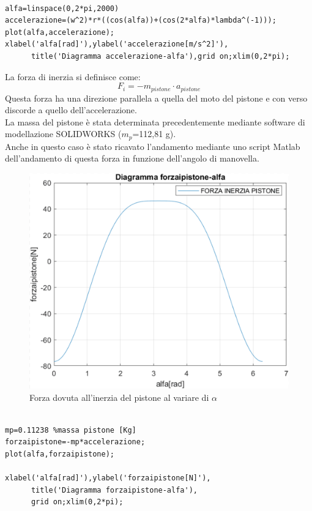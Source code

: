 \begin{lstlisting}[frame=trBL]
%Grafico accelerazione al variare di alfa

alfa=linspace(0,2*pi,2000)
accelerazione=(w^2)*r*((cos(alfa))+(cos(2*alfa)*lambda^(-1)));
plot(alfa,accelerazione);
xlabel('alfa[rad]'),ylabel('accelerazione[m/s^2]'),
      title('Diagramma accelerazione-alfa'),grid on;xlim(0,2*pi);
\end{lstlisting}
\newpage
La forza di inerzia si definisce come:
\begin{equation}
    F_i=-m_{pistone}\cdot a_{pistone}
\end{equation}
Questa forza ha una direzione parallela a quella del moto del pistone e con verso discorde a quello dell’accelerazione.\\
La massa del pistone è stata determinata precedentemente mediante software di modellazione SOLIDWORKS ($m_p$=112,81 g).\\
Anche in questo caso è stato ricavato l'andamento mediante uno script Matlab dell'andamento di questa forza in funzione dell'angolo di manovella.
\begin{figure}[h]
    \centering
    \includegraphics[scale=0.33]{Immagini/GraficoInerziaPistone.png}
    \caption{Forza dovuta all'inerzia del pistone al variare di $\alpha$}
    \label{fig:GraficoInerziaPistone}
\end{figure}
\begin{lstlisting}[frame=trBL]
%Grafico forza inerzia al variare di alfa

mp=0.11238 %massa pistone [Kg]
forzaipistone=-mp*accelerazione;
plot(alfa,forzaipistone);

xlabel('alfa[rad]'),ylabel('forzaipistone[N]'),
      title('Diagramma forzaipistone-alfa'),
      grid on;xlim(0,2*pi);
\end{lstlisting}
